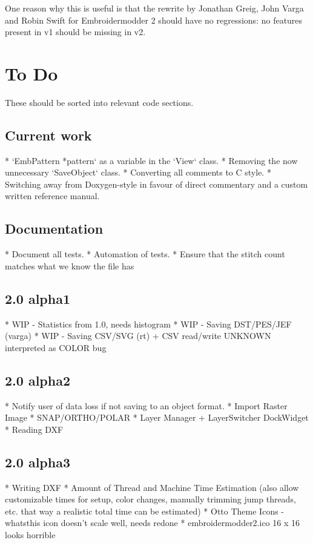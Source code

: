 \documentclass[11pt]{report}
\begin{document}
One reason why this is useful is that the rewrite by Jonathan Greig, John Varga
and Robin Swift for Embroidermodder 2 should have no regressions: no features
present in v1 should be missing in v2.

\section{To Do}

These should be sorted into relevant code sections.

\subsection{Current work}

* `EmbPattern *pattern` as a variable in the `View` class.
* Removing the now unnecessary `SaveObject` class.
* Converting all comments to C style.
* Switching away from Doxygen-style in favour of direct commentary and a custom written reference manual.

\subsection{Documentation}

* Document all tests.
* Automation of tests.
* Ensure that the stitch count matches what we know the file has

\subsection{2.0 alpha1}

* WIP - Statistics from 1.0, needs histogram
* WIP - Saving DST/PES/JEF (varga)
* WIP - Saving CSV/SVG (rt) + CSV read/write UNKNOWN interpreted as COLOR bug

\subsection{2.0 alpha2}

* Notify user of data loss if not saving to an object format.
* Import Raster Image
* SNAP/ORTHO/POLAR
* Layer Manager + LayerSwitcher DockWidget
* Reading DXF

\subsection{2.0 alpha3}

* Writing DXF
* Amount of Thread and Machine Time Estimation (also allow customizable times for setup, color changes, manually trimming jump threads, etc. that way a realistic total time can be estimated)
* Otto Theme Icons - whatsthis icon doesn't scale well, needs redone
* embroidermodder2.ico 16 x 16 looks horrible
\end{document}
